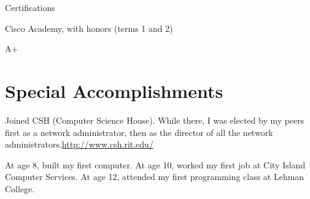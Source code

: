 \documentclass[a4paper,margin,line]{resume}
\newcommand{\rurl}[1]{\hfill {\footnotesize \url{#1}}}
\begin{document}
\begin{resume}
\begin{compactdesc}
		\item[Certifications] \begin{inparaenum} { \small
			\item Cisco Academy, with honors (terms 1 and 2)
			\item A+
		} \end{inparaenum}
	\end{compactdesc}



\section{\mysidestyle Special Accomplishments}
	\begin{asparablank}
		\item Joined CSH ({\small Computer Science House}). While there, I was elected by my peers first as a network administrator, then as the director of all the network administrators.\rurl{http://www.csh.rit.edu/}
		\item At age 8, built my first computer. At age 10, worked my first job at City Island Computer Services. At age 12, attended my first programming class at Lehman College.
	\end{asparablank}

\end{resume}
\end{document}
